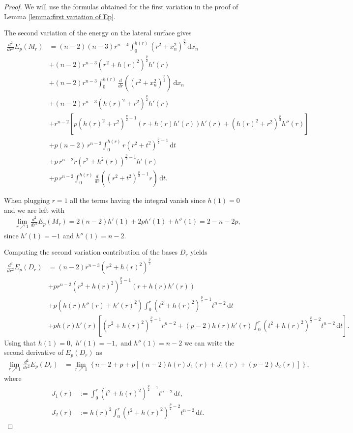 \documentclass[10pt,leqno]{amsart}
\newcommand{\dd}{\, \mathrm{d}}
\numberwithin{Theorem}{section}
\theoremstyle{definition}
\theoremstyle{remark}
\numberwithin{equation}{section}
\numberwithin{equation}{section}
\begin{document}
\begin{proof} We will use the formulas obtained for the first variation in the proof of Lemma \ref{lemma:first variation of Ep}.

The second variation of the energy on the lateral surface gives
\begin{align*}
    \frac{d^2}{dr^2}E_p(M_r) &= (n-2)(n-3)r^{n-4}\int_0^{h(r)}(r^2+x_n^2)^{\frac{p}{2}}\dd x_n  \\
    &+(n-2)r^{n-3}(r^2+h(r)^2)^{\frac{p}{2}}  h'(r)  \\
    &+(n-2)r^{n-3} \int_0^{h(r)}\frac{d}{dr} \left((r^2+x_n^2)^{\frac{p}{2}} \right)\dd x_n  \\
    &+ (n-2)r^{n-3}(h(r)^2+r^2)^{\frac{p}{2}}h'(r)  \\
    &+ r^{n-2}\left[p(h(r)^2+r^2)^{\frac{p}{2}-1} \left( r+h(r)h'(r)\right)h'(r) +(h(r)^2+r^2)^{\frac{p}{2}}h''(r) \right] \\
    &+  p (n-2)\,  r^{n-3} \int_{0}^{h(r)}  r \left( r^2 + t^2 \right)^{\frac{p}{2}-1} \dd t \\
    &+  p \,  r^{n-2} r\left( r^2 + h^2(r)\right)^{\frac{p}{2}-1}h'(r) \\
    &+ p \, r^{n-2} \int_0^{h(r)} \frac{d}{dr} \left( (r^2 +t^2)^{\frac{p}{2}-1} r \right) \dd t.
\end{align*}

When plugging $r=1$ all the terms having the integral vanish since $h(1)=0$ and we are left with
\begin{align}\label{EpMr double prime}
   \lim_{r\nearrow 1}  \frac{d^2}{dr^2}E_p(M_r) = 2(n-2)h'(1) + 2p h'(1) +h''(1)   =  2-n-2p,
\end{align}
since $h'(1)=-1$ and $h''(1)=n-2$.

Computing the second variation contribution of the bases $D_r$ yields
\begin{align*}
    \frac{d^2}{dr^2}E_p(D_r)&= (n-2) r^{n-3} \left(r^2 +h(r)^2 \right)^{\frac{p}{2}}   \\
    &+ p r^{n-2} \left(r^2 +h(r)^2 \right)^{\frac{p}{2}-1} \left(r+h(r)h'(r) \right)   \\
    &+ p   \left( h(r)h''(r)+h'(r)^2\right) \int_0^r  \left( t^2 +h(r)^2 \right)^{\frac{p}{2}-1} t^{n-2} \dd t  \\
    &+ph(r)h'(r) \left[ \left(r^2+h(r)^2 \right)^{\frac{p}{2}-1} r^{n-2} + (p-2) h(r)h'(r)\int_{0}^{r} \left( t^2 +h(r)^2 \right)^{\frac{p}{2}-2} t^{n-2} \dd t\right].
\end{align*}
Using that $h(1)=0,$ $h'(1)=-1,$ and $h''(1)=n-2$ we can write the second derivative of $E_p(D_r)$ as
\begin{align}\label{EpDr double prime with limit}
    \lim_{r\nearrow 1}\frac{d^2}{dr^2}E_p(D_r) &= \lim_{r\nearrow 1} \left\{ n-2 + p+p [(n-2)h(r)J_1(r)+J_1(r) + (p-2)J_2(r)]\right\},  
     \end{align}
where
\begin{align*}
    J_1(r)&:= \int_0^r  \left( t^2 +h(r)^2 \right)^{\frac{p}{2}-1} t^{n-2} \dd t, \\
    J_2(r)&:= h(r)^2 \int_{0}^{r} \left( t^2 +h(r)^2 \right)^{\frac{p}{2}-2} t^{n-2} \dd t.
\end{align*}



\end{proof}
\end{document}
